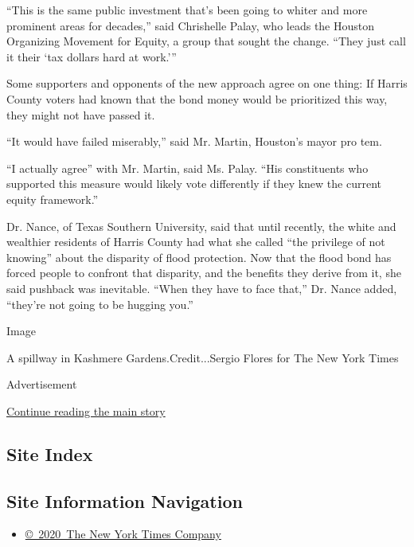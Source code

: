 ``This is the same public investment that's been going to whiter and
more prominent areas for decades,'' said Chrishelle Palay, who leads the
Houston Organizing Movement for Equity, a group that sought the change.
``They just call it their `tax dollars hard at work.'''

Some supporters and opponents of the new approach agree on one thing: If
Harris County voters had known that the bond money would be prioritized
this way, they might not have passed it.

``It would have failed miserably,'' said Mr. Martin, Houston's mayor pro
tem.

``I actually agree'' with Mr. Martin, said Ms. Palay. ``His constituents
who supported this measure would likely vote differently if they knew
the current equity framework.''

Dr. Nance, of Texas Southern University, said that until recently, the
white and wealthier residents of Harris County had what she called ``the
privilege of not knowing'' about the disparity of flood protection. Now
that the flood bond has forced people to confront that disparity, and
the benefits they derive from it, she said pushback was inevitable.
``When they have to face that,'' Dr. Nance added, ``they're not going to
be hugging you.''

Image

A spillway in Kashmere Gardens.Credit...Sergio Flores for The New York
Times

Advertisement

\protect\hyperlink{after-bottom}{Continue reading the main story}

\hypertarget{site-index}{%
\subsection{Site Index}\label{site-index}}

\hypertarget{site-information-navigation}{%
\subsection{Site Information
Navigation}\label{site-information-navigation}}

\begin{itemize}
\tightlist
\item
  \href{https://help.nytimes.com/hc/en-us/articles/115014792127-Copyright-notice}{©~2020~The
  New York Times Company}
\end{itemize}

